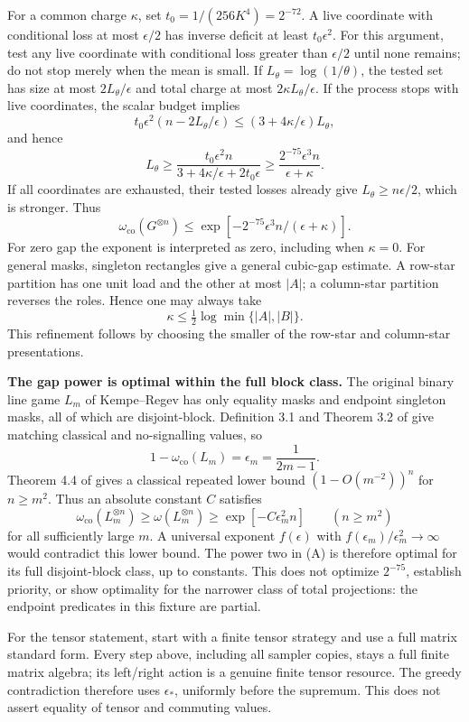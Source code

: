 \documentclass[11pt,reqno]{amsart}
\numberwithin{equation}{section}
\begin{document}
For a common charge \(\kappa\), set \(t_0=1/(256K^4)=2^{-72}\). A live coordinate with conditional loss at most \(\epsilon/2\) has inverse deficit at least \(t_0\epsilon^2\). For this argument, test any live coordinate with conditional loss greater than \(\epsilon/2\) until none remains; do not stop merely when the mean is small. If \(L_\theta=\log(1/\theta)\), the tested set has size at most \(2L_\theta/\epsilon\) and total charge at most \(2\kappa L_\theta/\epsilon\). If the process stops with live coordinates, the scalar budget implies \[
 t_0\epsilon^2(n-2L_\theta/\epsilon)
       \le(3+4\kappa/\epsilon)L_\theta,
\] and hence \[
 L_\theta\ge
 \frac{t_0\epsilon^2n}{3+4\kappa/\epsilon+2t_0\epsilon}
 \ge\frac{2^{-75}\epsilon^3n}{\epsilon+\kappa}.
\] If all coordinates are exhausted, their tested losses already give \(L_\theta\ge n\epsilon/2\), which is stronger. Thus \[
 \boxed{\omega_{\mathrm{co}}(G^{\otimes n})
 \le\exp[-2^{-75}\epsilon^3n/(\epsilon+\kappa)].} \tag{6.4}
\] For zero gap the exponent is interpreted as zero, including when \(\kappa=0\). For general masks, singleton rectangles give a general cubic-gap estimate. A row-star partition has one unit load and the other at most \(|A|\); a column-star partition reverses the roles. Hence one may always take \[
 \kappa\le\tfrac12\log\min\{|A|,|B|\}. \tag{6.5}
\] This refinement follows by choosing the smaller of the row-star and column-star presentations.

\textbf{The gap power is optimal within the full block class.} The original binary line game \(L_m\) of Kempe--Regev has only equality masks and endpoint singleton masks, all of which are disjoint-block. Definition 3.1 and Theorem 3.2 of \cite{KR} give matching classical and no-signalling values, so \[
 1-\omega_{\mathrm{co}}(L_m)=\epsilon_m=\frac1{2m-1}.
\] Theorem 4.4 of \cite{KR} gives a classical repeated lower bound \((1-O(m^{-2}))^n\) for \(n\ge m^2\). Thus an absolute constant \(C\) satisfies \[
 \omega_{\mathrm{co}}(L_m^{\otimes n})
 \ge\omega(L_m^{\otimes n})
 \ge \exp[-C\epsilon_m^2n]\qquad(n\ge m^2)
\] for all sufficiently large \(m\). A universal exponent \(f(\epsilon)\) with \(f(\epsilon_m)/\epsilon_m^2\to\infty\) would contradict this lower bound. The power two in (A) is therefore optimal for its full disjoint-block class, up to constants. This does not optimize \(2^{-75}\), establish priority, or show optimality for the narrower class of total projections: the endpoint predicates in this fixture are partial.

For the tensor statement, start with a finite tensor strategy and use a full matrix standard form. Every step above, including all sampler copies, stays a full finite matrix algebra; its left/right action is a genuine finite tensor resource. The greedy contradiction therefore uses \(\epsilon_*\), uniformly before the supremum. This does not assert equality of tensor and commuting values.
\end{document}
